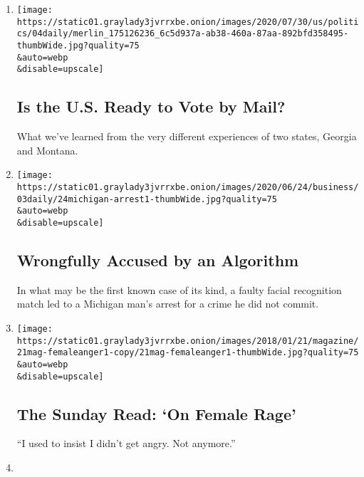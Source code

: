 \begin{enumerate}
\def\labelenumi{\arabic{enumi}.}
\item
  \href{/2020/08/04/podcasts/the-daily/mail-in-voting-president-trump.html}{}

  \texttt{[image: https://static01.graylady3jvrrxbe.onion/images/2020/07/30/us/politics/04daily/merlin\_175126236\_6c5d937a-ab38-460a-87aa-892bfd358495-thumbWide.jpg?quality=75\\\&auto=webp\\\&disable=upscale]}

  \hypertarget{is-the-us-ready-to-vote-by-mail}{%
  \subsection{Is the U.S. Ready to Vote by
  Mail?}\label{is-the-us-ready-to-vote-by-mail}}

  What we've learned from the very different experiences of two states,
  Georgia and Montana.
\item
  \href{/2020/08/03/podcasts/the-daily/algorithmic-justice-racism.html}{}

  \texttt{[image: https://static01.graylady3jvrrxbe.onion/images/2020/06/24/business/03daily/24michigan-arrest1-thumbWide.jpg?quality=75\\\&auto=webp\\\&disable=upscale]}

  \hypertarget{wrongfully-accused-by-an-algorithm}{%
  \subsection{Wrongfully Accused by an
  Algorithm}\label{wrongfully-accused-by-an-algorithm}}

  In what may be the first known case of its kind, a faulty facial
  recognition match led to a Michigan man's arrest for a crime he did
  not commit.
\item
  \href{/2020/08/02/podcasts/the-daily/on-female-rage.html}{}

  \texttt{[image: https://static01.graylady3jvrrxbe.onion/images/2018/01/21/magazine/21mag-femaleanger1-copy/21mag-femaleanger1-thumbWide.jpg?quality=75\\\&auto=webp\\\&disable=upscale]}

  \hypertarget{the-sunday-read-on-female-rage}{%
  \subsection{The Sunday Read: `On Female
  Rage'}\label{the-sunday-read-on-female-rage}}

  ``I used to insist I didn't get angry. Not anymore.''
\item
  \href{/2020/07/31/podcasts/the-daily/vanessa-guillen-military-metoo.html}{}


\end{enumerate}
